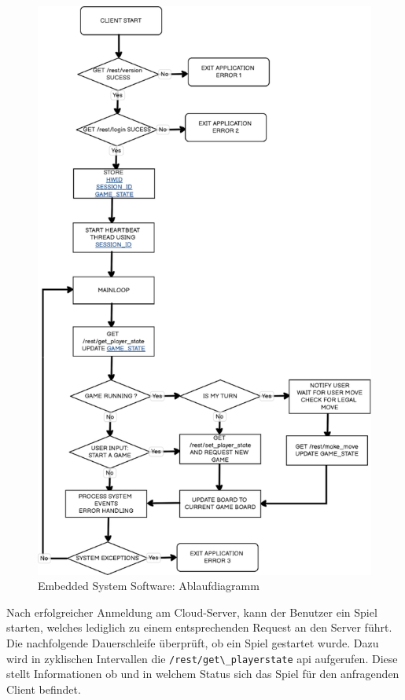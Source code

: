 \begin{figure}
\centering
\includegraphics{images/ATC_gameclient_statemachiene.png}
\caption{Embedded System Software: Ablaufdiagramm
\label{ATC_gameclient_statemachiene}}
\end{figure}

Nach erfolgreicher Anmeldung am Cloud-Server, kann der Benutzer ein
Spiel starten, welches lediglich zu einem entsprechenden Request an den
Server führt. Die nachfolgende Dauerschleife überprüft, ob ein Spiel
gestartet wurde. Dazu wird in zyklischen Intervallen die
\passthrough{\lstinline!/rest/get\_playerstate!} \gls{api} aufgerufen.
Diese stellt Informationen ob und in welchem Status sich das Spiel für
den anfragenden Client befindet.

